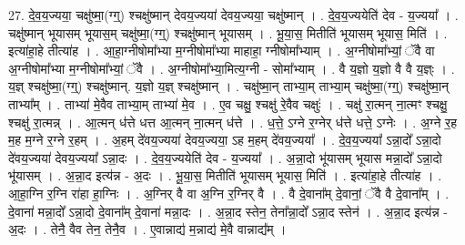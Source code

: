 \documentclass[17pt]{extarticle}
\begin{document}
27. दे॒व॒य॒ज्यया॒ चक्षु॑ष्मा॒(ग्ग्॒) श्चक्षु॑ष्मान् देवय॒ज्यया॑ देवय॒ज्यया॒ चक्षु॑ष्मान् । . दे॒व॒य॒ज्ययेति॑ देव - य॒ज्यया᳚ । . चक्षु॑ष्मान् भूयासम् भूयास॒म् चक्षु॑ष्मा॒(ग्ग्॒) श्चक्षु॑ष्मान् भूयासम् । . भू॒या॒स॒ मितीति॑ भूयासम् भूयास॒ मिति॑ । . इत्या॑हा॒हे तीत्या॑ह । . आ॒हा॒ग्नीषोमा᳚भ्या म॒ग्नीषोमा᳚भ्या माहाहा॒ ग्नीषोमा᳚भ्याम् । . अ॒ग्नीषोमा᳚भ्यां॒ ॅवै वा अ॒ग्नीषोमा᳚भ्या म॒ग्नीषोमा᳚भ्यां॒ ॅवै । . अ॒ग्नीषोमा᳚भ्या॒मित्य॒ग्नी - सोमा᳚भ्याम् । . वै य॒ज्ञो य॒ज्ञो वै वै य॒ज्ञ्ः । . य॒ज्ञ् श्चक्षु॑ष्मा॒(ग्ग्॒) श्चक्षु॑ष्मान्. य॒ज्ञो य॒ज्ञ् श्चक्षु॑ष्मान् । . चक्षु॑ष्मा॒न् ताभ्या॒म् ताभ्या॒म् चक्षु॑ष्मा॒(ग्ग्॒) श्चक्षु॑ष्मा॒न् ताभ्या᳚म् । . ताभ्या॑ मे॒वैव ताभ्या॒म् ताभ्या॑ मे॒व । . ए॒व चक्षु॒ श्चक्षु॑ रे॒वैव चक्षुः॑ । . चक्षु॑ रा॒त्मन् ना॒त्मꣳ श्चक्षु॒ श्चक्षु॑ रा॒त्मन्न् । . आ॒त्मन् ध॑त्ते धत्त आ॒त्मन् ना॒त्मन् ध॑त्ते । . ध॒त्ते॒ ऽग्ने र॒ग्नेर् ध॑त्ते धत्ते॒ ऽग्नेः । . अ॒ग्ने र॒ह म॒ह म॒ग्ने र॒ग्ने र॒हम् । . अ॒हम् दे॑वय॒ज्यया॑ देवय॒ज्यया॒ ऽह म॒हम् दे॑वय॒ज्यया᳚ । . दे॒व॒य॒ज्यया᳚ ऽन्ना॒दो᳚ ऽन्ना॒दो दे॑वय॒ज्यया॑ देवय॒ज्यया᳚ ऽन्ना॒दः । . दे॒व॒य॒ज्ययेति॑ देव - य॒ज्यया᳚ । . अ॒न्ना॒दो भू॑यासम् भूयास मन्ना॒दो᳚ ऽन्ना॒दो भू॑यासम् । . अ॒न्ना॒द इत्य॑न्न - अ॒दः । . भू॒या॒स॒ मितीति॑ भूयासम् भूयास॒ मिति॑ । . इत्या॑हा॒हे तीत्या॑ह । . आ॒हा॒ग्नि र॒ग्नि रा॑हा हा॒ग्निः । . अ॒ग्निर् वै वा अ॒ग्नि र॒ग्निर् वै । . वै दे॒वाना᳚म् दे॒वानां॒ ॅवै वै दे॒वाना᳚म् । . दे॒वाना॑ मन्ना॒दो᳚ ऽन्ना॒दो दे॒वाना᳚म् दे॒वाना॑ मन्ना॒दः । . अ॒न्ना॒द स्तेन॒ तेना᳚न्ना॒दो᳚ ऽन्ना॒द स्तेन॑ । . अ॒न्ना॒द इत्य॑न्न - अ॒दः । . तेनै॒ वैव तेन॒ तेनै॒व । . ए॒वान्नाद्य॑ म॒न्नाद्य॑ मे॒वै वान्नाद्य᳚म् । \newline
\end{document}
